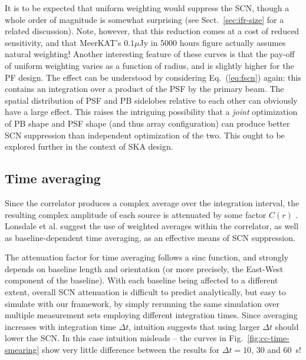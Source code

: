 \documentclass{aa}
\begin{document}
It is to be expected that uniform weighting would suppress the SCN, though a whole order of magnitude is somewhat surprising (see Sect.~\ref{sec:ifr-size} for a related discussion). Note, however, that this reduction comes at a cost of reduced sensitivity, and that MeerKAT's $0.1\mu$Jy in 5000 hours figure actually assumes natural weighting! Another interesting feature of these curves is that the pay-off of uniform weighting varies as a function of radius, and is slightly higher for the PF design. The effect can be understood by considering  Eq.~(\ref{eq:fscn}) again: this contains an integration over a product of the PSF by the primary beam. The spatial distribution of PSF and PB sidelobes relative to each other can obviously have a large effect. This raises the intriguing possibility that a \emph{joint} optimization of PB shape and PSF shape (and thus array configuration) can produce better SCN suppression than independent optimization of the two. This ought to be explored further in the context of SKA 
design.

\subsection{Time averaging}
\label{sec:smearing}

Since the correlator produces a complex average over the integration interval, the resulting complex amplitude of each source is attenuated by some factor $C(r)$ \citep[see Eq.~(\ref{eq:fscn}) above, and also Fig.~2 of][]{SKA54-expa,SKA54}. Lonsdale et al. suggest the use of weighted averages within the correlator, as well as baseline-dependent time averaging, as an effective means of SCN suppression.

The attenuation factor for time averaging follows a sinc function, and strongly depends on baseline length and orientation (or more precisely, the East-West component of the baseline). With each baseline being affected to a different extent, overall SCN attenuation is difficult to predict analytically, but easy to simulate with our framework, by simply rerunning the same simulation over multiple measurement sets employing different integration times. Since averaging increases with integration time $\Delta t$, intuition suggests that using larger $\Delta t$ should lower the SCN. In this case intuition misleads -- the curves in Fig.~\ref{fig:cc-time-smearing} show very little difference between the results for $\Delta t=10$, 30 and 60~s!
\end{document}
